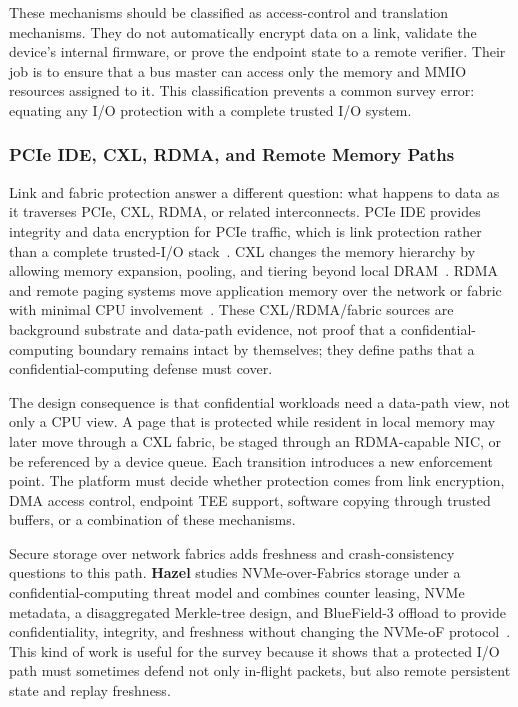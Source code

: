 These mechanisms should be classified as access-control and translation
mechanisms. They do not automatically encrypt data on a link, validate the
device's internal firmware, or prove the endpoint state to a remote verifier.
Their job is to ensure that a bus master can access only the memory and MMIO
resources assigned to it. This classification prevents a common survey error:
equating any I/O protection with a complete trusted I/O system.

\subsubsection{PCIe IDE, CXL, RDMA, and Remote Memory Paths}

Link and fabric protection answer a different question: what happens to data as
it traverses PCIe, CXL, RDMA, or related interconnects. PCIe IDE provides
integrity and data encryption for PCIe traffic, which is link protection rather
than a complete trusted-I/O stack~\cite{pcie_ide}. CXL changes the memory
hierarchy by allowing memory expansion, pooling, and tiering beyond local
DRAM~\cite{cxl_spec,gouk2022directcxl,zhong2024cxltiers}. RDMA and remote paging
systems move application memory over the network or fabric with minimal CPU
involvement~\cite{wang2025odrp}. These CXL/RDMA/fabric sources are background
substrate and data-path evidence, not proof that a confidential-computing
boundary remains intact by themselves; they define paths that a
confidential-computing defense must cover.

The design consequence is that confidential workloads need a data-path view, not
only a CPU view. A page that is protected while resident in local memory may
later move through a CXL fabric, be staged through an RDMA-capable NIC, or be
referenced by a device queue. Each transition introduces a new enforcement
point. The platform must decide whether protection comes from link encryption,
DMA access control, endpoint TEE support, software copying through trusted
buffers, or a combination of these mechanisms.

Secure storage over network fabrics adds freshness and crash-consistency
questions to this path. \textbf{Hazel} studies NVMe-over-Fabrics storage under a
confidential-computing threat model and combines counter leasing, NVMe metadata,
a disaggregated Merkle-tree design, and BlueField-3 offload to provide
confidentiality, integrity, and freshness without changing the NVMe-oF
protocol~\cite{chrapek2026hazel}. This kind of work is useful for the survey
because it shows that a protected I/O path must sometimes defend not only
in-flight packets, but also remote persistent state and replay freshness.

